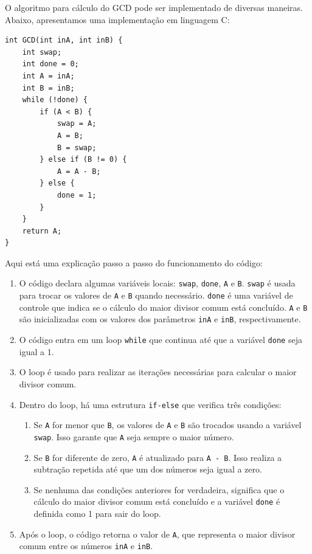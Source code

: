 \documentclass[a4paper,11pt]{article} %
\begin{document}
O algoritmo para cálculo do GCD pode ser implementado de diversas maneiras. 
Abaixo, apresentamos uma implementação em linguagem C:

\begin{verbatim}
int GCD(int inA, int inB) {
    int swap;
    int done = 0;
    int A = inA;
    int B = inB;
    while (!done) {
        if (A < B) {
            swap = A;
            A = B;
            B = swap;
        } else if (B != 0) {
            A = A - B;
        } else {
            done = 1;
        }
    }
    return A;
}
\end{verbatim}


Aqui está uma explicação passo a passo do funcionamento do código:
\begin{enumerate}
    \item O código declara algumas variáveis locais: \texttt{swap}, \texttt{done}, \texttt{A} e \texttt{B}. \texttt{swap} é usada para trocar os valores de \texttt{A} e \texttt{B} quando necessário. \texttt{done} é uma variável de controle que indica se o cálculo do maior divisor comum está concluído. \texttt{A} e \texttt{B} são inicializadas com os valores dos parâmetros \texttt{inA} e \texttt{inB}, respectivamente.
    \item O código entra em um loop \texttt{while} que continua até que a variável \texttt{done} seja igual a 1.
    \item O loop é usado para realizar as iterações necessárias para calcular o maior divisor comum.
    \item Dentro do loop, há uma estrutura \texttt{if-else} que verifica três condições:
    \begin{enumerate}
        \item Se \texttt{A} for menor que \texttt{B}, os valores de \texttt{A} e \texttt{B} são trocados usando a variável \texttt{swap}. Isso garante que \texttt{A} seja sempre o maior número.
        \item Se \texttt{B} for diferente de zero, \texttt{A} é atualizado para \texttt{A - B}. Isso realiza a subtração repetida até que um dos números seja igual a zero.
        \item Se nenhuma das condições anteriores for verdadeira, significa que o cálculo do maior divisor comum está concluído e a variável \texttt{done} é definida como 1 para sair do loop.
    \end{enumerate}
    \item Após o loop, o código retorna o valor de \texttt{A}, que representa o maior divisor comum entre os números \texttt{inA} e \texttt{inB}.
\end{enumerate}
\end{document}
